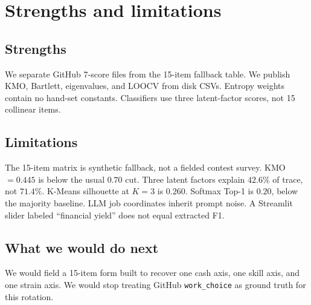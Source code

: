 \documentclass[12pt]{article}
\begin{document}
\section{Strengths and limitations}

\subsection{Strengths}
We separate GitHub 7-score files from the 15-item fallback table.
We publish KMO, Bartlett, eigenvalues, and LOOCV from disk CSVs.
Entropy weights contain no hand-set constants.
Classifiers use three latent-factor scores, not 15 collinear items.

\subsection{Limitations}
The 15-item matrix is synthetic fallback, not a fielded contest survey.
KMO \(=0.445\) is below the usual \(0.70\) cut.
Three latent factors explain \(42.6\%\) of trace, not \(71.4\%\).
K-Means silhouette at \(K=3\) is \(0.260\).
Softmax Top-1 is \(0.20\), below the majority baseline.
LLM job coordinates inherit prompt noise.
A Streamlit slider labeled ``financial yield'' does not equal extracted F1.

\subsection{What we would do next}
We would field a 15-item form built to recover one cash axis, one skill axis, and one strain axis.
We would stop treating GitHub \texttt{work\_choice} as ground truth for this rotation.


\end{document}
